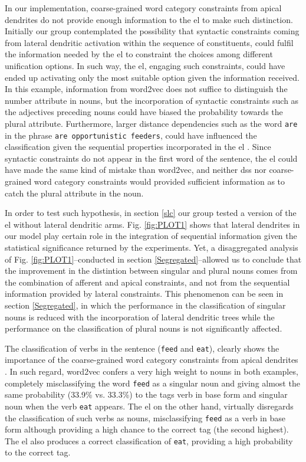 {In our implementation, coarse-grained word category constraints from apical dendrites do not provide enough information to the \gls{el} to make such distinction. Initially our group contemplated the possibility that syntactic constraints coming from lateral dendritic activation within the sequence of constituents, could fulfil the information needed by the \gls{el} to constraint the choices among different unification options. In such way, the \gls{el}, engaging such constraints, could have ended up activating only the most suitable option given the information received.
In this example,  information from word2vec does not suffice to distinguish the number attribute in nouns, but the incorporation of syntactic constraints such as the adjectives preceding nouns could have biased the probability towards the plural attribute. Furthermore, larger distance dependencies such as the word \texttt{are} in the phrase \texttt{are opportunistic feeders}, could have influenced the classification given the sequential properties incorporated in the \gls{el} \cite{Cui:2016:COS:3030654.3030660}.
Since syntactic constraints do not appear in the first word of the sentence, the \gls{el} could have made the same kind of mistake than word2vec, and neither \glspl{ds} nor coarse-grained word category constraints would provided sufficient information as to catch the plural attribute in the noun.

In order to test such hypothesis, in section \ref{slc} our group tested a version of the \gls{el} without lateral dendritic arms.
Fig. \ref{fig:PLOT1} shows that lateral dendrites in our model play certain role in the integration of sequential information
given the statistical significance returned by the experiments.
Yet, a disaggregated analysis of Fig. \ref{fig:PLOT1}--conducted in section \ref{Segregated}--allowed us to conclude that the improvement in the distintion between singular and plural nouns comes from the combination of afferent and apical constraints, and not from the sequential information provided by lateral constraints.
This phenomenon can be seen in section \ref{Segregated}, in which the performance in the classification of singular nouns is reduced with the incorporation of lateral dendritic trees while the performance on the classification of plural nouns is not significantly affected.


The classification of verbs in the sentence (\texttt{feed} and \texttt{eat}), clearly shows the importance of the coarse-grained word category constraints from apical dendrites \cite{shi_newborn_1999,shi_morgan_allopenna_1998,Shi1995PerceptualCO,lohmann_phonological_2017,doi:10.1207/s15327078in1002_5}. In such regard, word2vec confers a very high weight to nouns in both examples, completely misclassifying the word \texttt{feed} as a singular noun and giving almost the same probability (33.9\% vs. 33.3\%) to the tags verb in base form and singular noun when the verb \texttt{eat} appears. The \gls{el} on the other hand, virtually disregards the classification of such verbs as nouns, misclassifying \texttt{feed} as a verb in base form although providing a high chance to the correct tag (the second highest). The \gls{el} also produces a correct classification of \texttt{eat}, providing a high probability to the correct tag.

}
